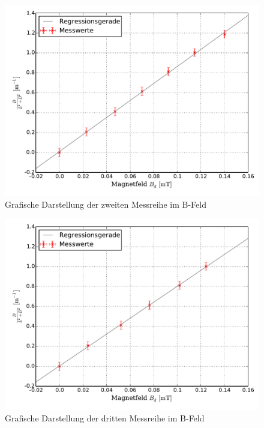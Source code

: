 		\begin{figure}[!h]
			\centering
			\includegraphics[scale=0.7]{Grafiken/BFeld_Messreihe_II.pdf}
			\caption{Grafische Darstellung der zweiten Messreihe im B-Feld}\label{fig:Auswertung_Messdaten_II_II}
		\end{figure}
		\begin{figure}[!h]
		\centering
			\includegraphics[scale=0.7]{Grafiken/BFeld_Messreihe_III.pdf}
			\caption{Grafische Darstellung der dritten Messreihe im B-Feld}\label{fig:Auswertung_Messdaten_II_III}
		\end{figure}
